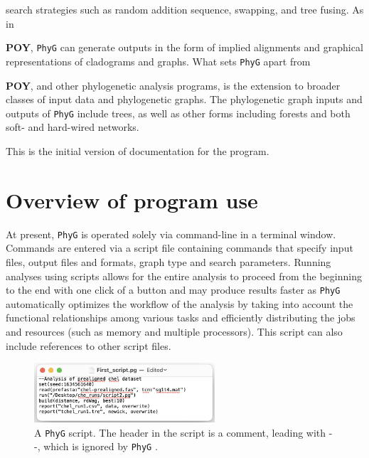 \documentclass[11pt]{book}
\newcommand{\phyg}{\texttt{PhyG} }
\begin{document}
	search strategies such as random addition sequence, swapping, and tree fusing. As in {\textbf{POY}, 
	\phyg can generate outputs in the form of implied alignments and graphical representations of 
	cladograms and graphs. What sets \phyg apart from {\textbf{POY}, and other phylogenetic 
	analysis programs, is the extension to broader classes of input data and phylogenetic graphs. 
	The phylogenetic graph inputs and outputs of \texttt{PhyG} include trees, as well as other forms 
	including forests and both soft- and hard-wired networks.
		
	This is the initial version of documentation for the program.
	
	\section{Overview of program use}
	At present, \phyg  is operated solely via command-line in a terminal window. Commands 
	are entered via a script file containing commands that specify input files, output files and 
	formats, graph type and search parameters. Running analyses using scripts allows for the 
	entire analysis to proceed from the beginning to the end with one click of a button and 
	may produce results faster as \phyg automatically optimizes the workflow of the analysis
	by taking into account the functional relationships among various tasks and efficiently 
	distributing the jobs and resources (such as memory and multiple processors). This script 
	can also include references to other script files.

	
	\begin{figure}
	\centering
	\includegraphics[width=0.6\textwidth]{First_script.jpg}
	\caption{A \phyg script. The header in the script is a comment, leading with -{}-, which is 
	ignored by \phyg.}
	\end{figure}
	
}}
\end{document}
